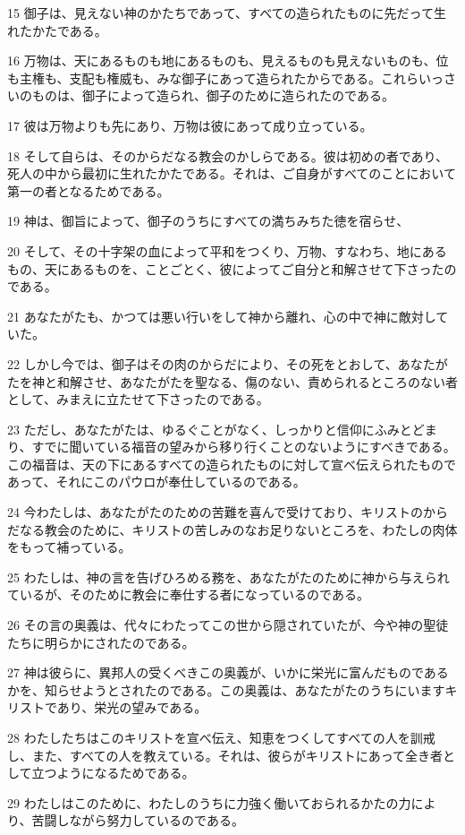 \par 15 御子は、見えない神のかたちであって、すべての造られたものに先だって生れたかたである。
\par 16 万物は、天にあるものも地にあるものも、見えるものも見えないものも、位も主権も、支配も権威も、みな御子にあって造られたからである。これらいっさいのものは、御子によって造られ、御子のために造られたのである。
\par 17 彼は万物よりも先にあり、万物は彼にあって成り立っている。
\par 18 そして自らは、そのからだなる教会のかしらである。彼は初めの者であり、死人の中から最初に生れたかたである。それは、ご自身がすべてのことにおいて第一の者となるためである。
\par 19 神は、御旨によって、御子のうちにすべての満ちみちた徳を宿らせ、
\par 20 そして、その十字架の血によって平和をつくり、万物、すなわち、地にあるもの、天にあるものを、ことごとく、彼によってご自分と和解させて下さったのである。
\par 21 あなたがたも、かつては悪い行いをして神から離れ、心の中で神に敵対していた。
\par 22 しかし今では、御子はその肉のからだにより、その死をとおして、あなたがたを神と和解させ、あなたがたを聖なる、傷のない、責められるところのない者として、みまえに立たせて下さったのである。
\par 23 ただし、あなたがたは、ゆるぐことがなく、しっかりと信仰にふみとどまり、すでに聞いている福音の望みから移り行くことのないようにすべきである。この福音は、天の下にあるすべての造られたものに対して宣べ伝えられたものであって、それにこのパウロが奉仕しているのである。
\par 24 今わたしは、あなたがたのための苦難を喜んで受けており、キリストのからだなる教会のために、キリストの苦しみのなお足りないところを、わたしの肉体をもって補っている。
\par 25 わたしは、神の言を告げひろめる務を、あなたがたのために神から与えられているが、そのために教会に奉仕する者になっているのである。
\par 26 その言の奥義は、代々にわたってこの世から隠されていたが、今や神の聖徒たちに明らかにされたのである。
\par 27 神は彼らに、異邦人の受くべきこの奥義が、いかに栄光に富んだものであるかを、知らせようとされたのである。この奥義は、あなたがたのうちにいますキリストであり、栄光の望みである。
\par 28 わたしたちはこのキリストを宣べ伝え、知恵をつくしてすべての人を訓戒し、また、すべての人を教えている。それは、彼らがキリストにあって全き者として立つようになるためである。
\par 29 わたしはこのために、わたしのうちに力強く働いておられるかたの力により、苦闘しながら努力しているのである。

